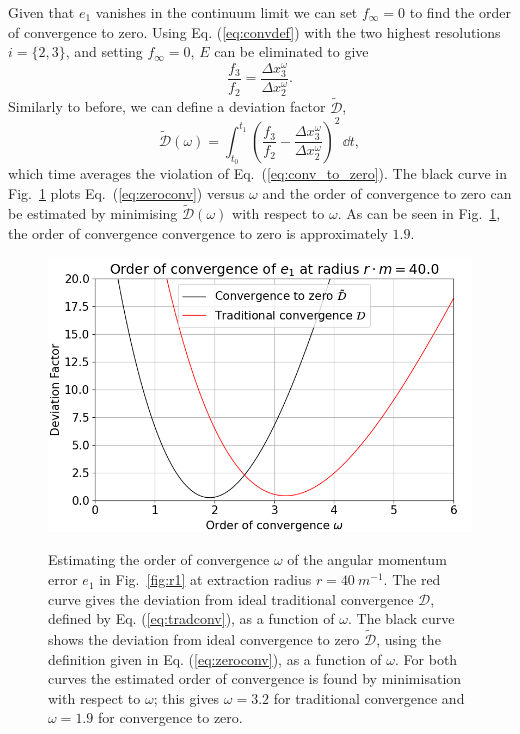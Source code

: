 Given that $e_1$ vanishes in the continuum limit we can set $f_\infty=0$ to find the order of convergence to zero. Using Eq. (\ref{eq:convdef}) with the two highest resolutions $i=\{2,3\}$, and setting $f_\infty=0$, $E$ can be eliminated to give
\begin{equation}\label{eq:conv_to_zero}
\frac{f_3}{f_2} = \frac{\Delta x_3^\omega}{\Delta x_2^\omega}.
\end{equation}
Similarly to before, we can define a deviation factor $\tilde{\mathcal{D}}$,
\begin{equation}\label{eq:zeroconv}
\tilde{\mathcal{D}}(\omega) = \int_{t_0}^{t_1}\left(\frac{f_3}{f_2} - \frac{\Delta x_3^\omega}{\Delta x_2^\omega}\right)^2\,\dd t,
\end{equation}
which time averages the violation of Eq.~(\ref{eq:conv_to_zero}). The black curve in Fig.~\ref{fig:D} plots Eq.~(\ref{eq:zeroconv}) versus $\omega$ and the order of convergence to zero can be estimated by minimising $\tilde{\mathcal{D}}(\omega)$ with respect to $\omega$. As can be seen in Fig.~\ref{fig:D}, the order of convergence convergence to zero is approximately $1.9$.
\begin{figure}[h]
{\includegraphics[width=0.95\columnwidth]{png/conv_order_40.0.png}}
\caption{Estimating the order of convergence $\omega$ of the angular momentum error $e_1$ in Fig.~\ref{fig:r1} at extraction radius $r=40 ~m^{-1}$. The red curve gives the deviation from ideal traditional convergence $\mathcal{D}$, defined by Eq. (\ref{eq:tradconv}), as a function of $\omega$. The black curve shows the deviation from ideal convergence to zero $\tilde{\mathcal{D}}$, using the definition given in Eq. (\ref{eq:zeroconv}), as a function of $\omega$.  For both curves the estimated order of convergence is found by minimisation with respect to $\omega$; this gives $\omega=3.2$ for traditional convergence and $\omega=1.9$ for convergence to zero. }
\label{fig:D}
\end{figure}














